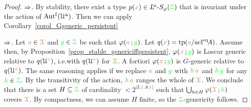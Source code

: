 \begin{proof} 
  $\IMP$.
  By stability, there exist a type $p({\mr x})\in\LDelta\mbox{-}S_\phi(\grZ)$ that is invariant under the action of $\Autf(\UDelta)$.
  Then we can apply Corollary~\ref{corol_Ggeneric_persistent}

  $\IMP$.
  Let ${\mr a}\in\mrX$ and ${\gr g}\in\grZ$ be such that $\phi({\mr a}\,;{\gr g})$.
  Let $q({\mr x})=\tp({\mr a}/\acl^\eq\!A)$.
  Assume  then, by Proposition~\ref{prop_stable_genericiffpersistent}, $\phi({\mr x}\,;{\gr g})$ is Lascar generic relative to $q(\U^{\mr x})$, i.e.\@ with $q(\U^{\mr x})$ for $\mrX$.
  A fortiori $\phi({\mr x}\,;{\gr g})$ is $G$-generic relative to $q(\U^{\mr x})$.
  The same reasoning applies if we replace ${\mr a}$ and ${\gr g}$ with  ${\gr h}\,{\mr a}$ and ${\gr h}\,{\gr g}$ for any ${\gr h}\in\grZ$.
  By the transitivity of the action, ${\gr h}\,{\mr a}$ ranges the whole of $\mrX$.
  We conclude that there is a set $H\subseteq\grZ$ of cardinality $<2^{|L(A)|}$ such that $\bigcup_{h\in H}\phi(\mrX\,;{\gr h})$ covers $\mrX$.
  By compactness, we can assume $H$ finite, so the $\grZ$-genericity follows.
\end{proof}

